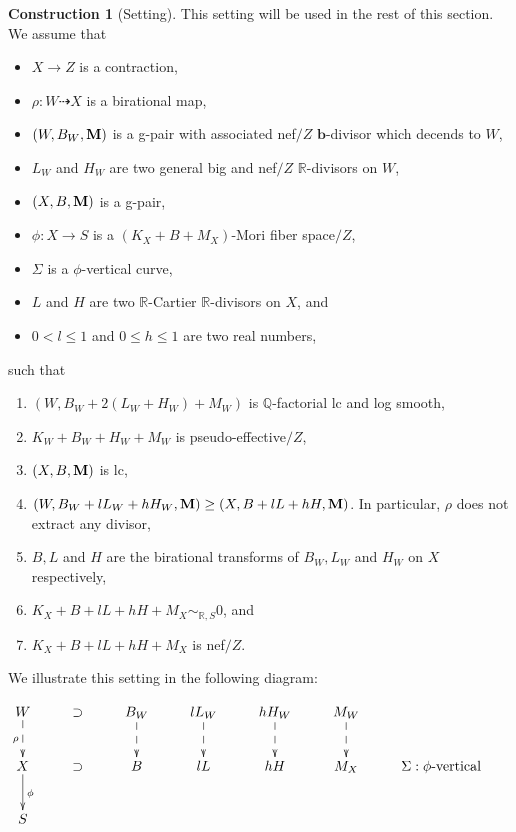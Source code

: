 \documentclass[11pt]{amsart}
\numberwithin{equation}{section}
\newcommand{\bb}{\bm{b}}
\newcommand{\Mm}{{\bf{M}}}
\newcommand{\Qq}{\mathbb{Q}}
\newcommand{\Rr}{\mathbb{R}}
\theoremstyle{definition}
\theoremstyle{definition}
\newtheorem{cons}[thm]{Construction}
\theoremstyle{definition}
\begin{document}
\begin{cons}[Setting]\label{cons: setting for sarkisov link}
This setting will be used in the rest of this section. We assume that
\begin{itemize}
    \item $X\rightarrow Z$ is a contraction,
    \item $\rho: W\dashrightarrow X$ is a birational map,
    \item $(W,B_W,\Mm)$ is a g-pair with associated nef$/Z$ $\bb$-divisor which decends to $W$,
    \item $L_W$ and $H_W$ are two general big and nef$/Z$ $\Rr$-divisors on $W$, 
    \item $(X,B,\Mm)$ is a g-pair, 
    \item $\phi: X\rightarrow S$ is a $(K_X+B+M_X)$-Mori fiber space$/Z$,
    \item $\Sigma$ is a $\phi$-vertical curve,
    \item $L$ and $H$ are two $\Rr$-Cartier $\Rr$-divisors on $X$, and
    \item $0<l\leq 1$ and $0\leq h\leq 1$ are two real numbers,
\end{itemize} 
such that
\begin{enumerate}
    \item $(W,B_W+2(L_W+H_W)+M_W)$ is $\Qq$-factorial lc and log smooth, 
    \item $K_W+B_W+H_W+M_W$ is pseudo-effective$/Z$,
    \item $(X,B,\Mm)$ is lc,
    \item $(W,B_W+lL_W+hH_W,\Mm)\geq (X,B+lL+hH,\Mm)$. In particular, $\rho$ does not extract any divisor,
    \item $B,L$ and $H$ are the birational transforms of $B_W,L_W$ and $H_W$ on $X$ respectively,
    \item $K_X+B+lL+hH+M_X\sim_{\mathbb R,S}0$, and
    \item $K_X+B+lL+hH+M_X$ is nef$/Z$.
\end{enumerate}
We illustrate this setting in the following diagram:
\medskip

\begin{center}$\xymatrix{
  W\ar@{-->}[d]_{\rho}&\supset & B_W\ar@{-->}[d] &lL_W\ar@{-->}[d] &hH_W\ar@{-->}[d] &M_W\ar@{-->}[d] &\\
      X \ar@{->}[d]^{\phi}&\supset & B &lL &hH &M_X  &\Sigma:\phi\text{-vertical}    \\
    S & }$
\end{center}
\end{cons}
\end{document}
